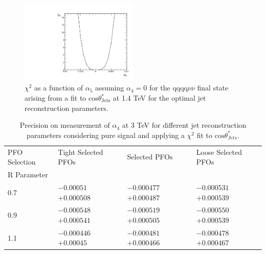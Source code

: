 \begin{figure}
\includegraphics[width=0.5\textwidth]{PhysicsAnalysis/Plots/Chi2ContoursOptimisation/1400GeV/KtSPFOsR0p90_alpha5.pdf}
\caption[$\chi^{2}$ as a function of $\alpha_{5}$ assuming $\alpha_{4} = 0$ for the $\text{qqqq}\nu\nu$ final state arising from a fit to $\text{cos}\theta^{*}_{\text{Jets}}$ at 1.4 TeV for the optimal jet reconstruction parameters.]{$\chi^{2}$ as a function of $\alpha_{5}$ assuming $\alpha_{4} = 0$ for the $\text{qqqq}\nu\nu$ final state arising from a fit to $\text{cos}\theta^{*}_{\text{Jets}}$ at 1.4 TeV for the optimal jet reconstruction parameters.}
\label{fig:a5chi2jetalgoideal1400GeV}
\end{figure}

\begin{table}[h!]
\centering
\begin{tabular}{l l l l}
\hline
PFO Selection & Tight Selected PFOs & Selected PFOs & Loose Selected PFOs \\ 
R Parameter & & & \\ 
\hline
0.7 & $-0.00051$ $+0.000508$ & $-0.000477$ $+0.000487$ & $-0.000531$ $+0.000539$ \\
0.9 & $-0.000548$ $+0.000541$ & $-0.000519$ $+0.000505$ & $-0.000550$ $+0.000539$ \\
1.1 & $-0.000446$ $+0.00045$ & $-0.000481$ $+0.000466$ & $-0.000478$ $+0.000467$ \\
\hline
\end{tabular}
\caption[$1\sigma$ precision on measurement of $\alpha_{4}$ for different jet reconstruction parameters considering pure signal at 3 TeV.]{Precision on measurement of $\alpha_{4}$ at 3 TeV for different jet reconstruction parameters considering pure signal and applying a $\chi^{2}$ fit to $\text{cos}\theta^{*}_{Jets}$.}
\label{table:precisiona4signaljetalgo3000GeV}
\end{table}

